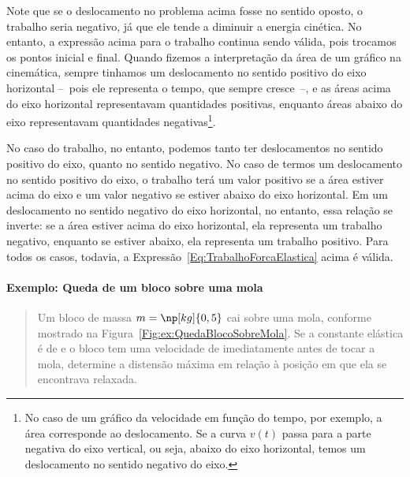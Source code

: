 Note que se o deslocamento no problema acima fosse no sentido oposto, o trabalho seria negativo, já que ele tende a diminuir a energia cinética. No entanto, a expressão acima para o trabalho continua sendo válida, pois trocamos os pontos inicial e final. Quando fizemos a interpretação da área de um gráfico na cinemática, sempre tinhamos um deslocamento no sentido positivo do eixo horizontal --~pois ele representa o tempo, que sempre cresce~--, e as áreas acima do eixo horizontal representavam quantidades positivas, enquanto áreas abaixo do eixo representavam quantidades negativas\footnote{No caso de um gráfico da velocidade em função do tempo, por exemplo, a área corresponde ao deslocamento. Se a curva $v(t)$ passa para a parte negativa do eixo vertical, ou seja, abaixo do eixo horizontal, temos um deslocamento no sentido negativo do eixo.}.

No caso do trabalho, no entanto, podemos tanto ter deslocamentos no sentido positivo do eixo, quanto no sentido negativo. No caso de termos um deslocamento no sentido positivo do eixo, o trabalho terá um valor positivo se a área estiver acima do eixo e um valor negativo se estiver abaixo do eixo horizontal. Em um deslocamento no sentido negativo do eixo horizontal, no entanto, essa relação se inverte: se a área estiver acima do eixo horizontal, ela representa um trabalho negativo, enquanto se estiver abaixo, ela representa um trabalho positivo. Para todos os casos, todavia, a Expressão~\eqref{Eq:TrabalhoForcaElastica} acima é válida.

\paragraph{Exemplo: Queda de um bloco sobre uma mola}

\begin{quote}
    Um bloco de massa $m = \np[kg]{0,5}$ cai sobre uma mola, conforme mostrado na Figura~\ref{Fig:ex:QuedaBlocoSobreMola}. Se a constante elástica é de  e o bloco tem uma velocidade de  imediatamente antes de tocar a mola, determine a distensão máxima em relação à posição em que ela se encontrava relaxada.
\end{quote}


